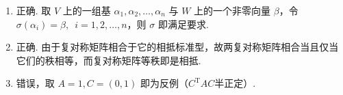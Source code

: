 \begin{enumerate}
\begin{enumerate}
        \item 正确. 取 \(V\) 上的一组基 \(\alpha_1,\alpha_2,\ldots,\alpha_n\) 与 \(W\) 上的一个非零向量 \(\beta\)，令 \(\sigma(\alpha_i)=\beta,\enspace\allowbreak i=1,2,\ldots,n\)，则 \(\sigma\) 即满足要求.

        \item 正确. 由于复对称矩阵相合于它的相抵标准型，故两复对称矩阵相合当且仅当它们的秩相等，而复对称矩阵等秩即是相抵.

        \item 错误，取 \(A=1,C=(0, 1)\) 即为反例（\(C^\mathrm{T}AC\)半正定）.
    \end{enumerate}
\end{enumerate}

\clearpage
